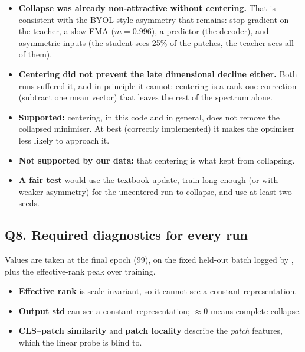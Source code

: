 \documentclass[11pt]{article}
\newcommand{\run}[1]{\texttt{\detokenize{#1}}}
\begin{document}
\begin{enumerate}
\begin{itemize}
    \item \textbf{Collapse was already non-attractive without centering.} That is consistent with the BYOL-style asymmetry that remains: stop-gradient on the teacher, a slow EMA ($m=0.996$), a predictor (the decoder), and asymmetric inputs (the student sees 25\% of the patches, the teacher sees all of them).
    \item \textbf{Centering did not prevent the late dimensional decline either.} Both runs suffered it, and in principle it cannot: centering is a rank-one correction (subtract one mean vector) that leaves the rest of the spectrum alone.
    \item \textbf{Supported:} centering, in this code and in general, does not remove the collapsed minimiser. At best (correctly implemented) it makes the optimiser less likely to approach it.
    \item \textbf{Not supported by our data:} that centering is what kept \run{feat75} from collapsing.
    \item \textbf{A fair test} would use the textbook update, train long enough (or with weaker asymmetry) for the uncentered run to collapse, and use at least two seeds.
  \end{itemize}
\end{enumerate}

\subsection*{Q8. Required diagnostics for every run}
Values are taken at the final epoch (99), on the fixed held-out batch logged by \run{train.py}, plus the effective-rank peak over training.
\begin{itemize}
  \item \textbf{Effective rank} is scale-invariant, so it cannot see a constant representation.
  \item \textbf{Output std} can see a constant representation; $\approx0$ means complete collapse.
  \item \textbf{CLS--patch similarity} and \textbf{patch locality} describe the \emph{patch} features, which the linear probe is blind to.
\end{itemize}
\end{document}
